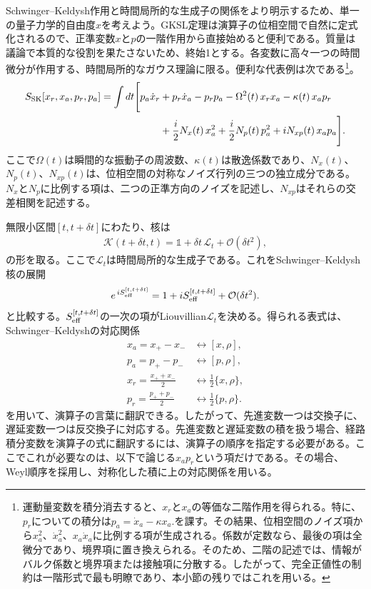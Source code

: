 \documentclass[a4paper,11pt,oneside]{article}
\theoremstyle{definition}
\numberwithin{equation}{section}
\begin{document}
Schwinger--Keldysh作用と時間局所的な生成子の関係をより明示するため、単一の量子力学的自由度\(x\)を考えよう。GKSL定理は演算子の位相空間で自然に定式化されるので、正準変数\(x\)と\(p\)の一階作用から直接始めると便利である。質量は議論で本質的な役割を果たさないため、終始1とする。各変数に高々一つの時間微分が作用する、時間局所的なガウス理論に限る。便利な代表例は次である\footnote{運動量変数を積分消去すると、\(x_r\)と\(x_a\)の等価な二階作用を得られる。特に、\(p_r\)についての積分は\(
p_a
=
\dot x_a-\kappa x_a.
\)を課す。その結果、位相空間のノイズ項から\(x_a^2\)、\(\dot x_a^2\)、\(x_a\dot x_a\)に比例する項が生成される。係数が定数なら、最後の項は全微分であり、境界項に置き換えられる。そのため、二階の記述では、情報がバルク係数と境界項または接触項に分散する。したがって、完全正値性の制約は一階形式で最も明瞭であり、本小節の残りではこれを用いる。}。
\begin{align}\label{GaussianSKfirstorder}
S_{\rm SK}[x_r,x_a,p_r,p_a]
=
\int dt \Bigg[
&p_a \dot x_r + p_r \dot x_a
-p_r p_a
-\Omega^2(t)\,x_r x_a
-\kappa(t)\,x_a p_r
\nonumber\\
&\qquad
+\frac{i}{2}N_x(t)\,x_a^2
+\frac{i}{2}N_p(t)\,p_a^2
+iN_{xp}(t)\,x_a p_a
\Bigg].
\end{align}
ここで\(\Omega(t)\)は瞬間的な振動子の周波数、\(\kappa(t)\)は散逸係数であり、\(N_x(t)\)、\(N_p(t)\)、\(N_{xp}(t)\)は、位相空間の対称なノイズ行列の三つの独立成分である。\(N_x\)と\(N_p\)に比例する項は、二つの正準方向のノイズを記述し、\(N_{xp}\)はそれらの交差相関を記述する。





無限小区間\([t,t+\delta t]\)にわたり、核は
\begin{align}\label{dictionary}
\mathcal K(t+\delta t,t)
=
\mathds{1}
+\delta t\,\mathcal L_t
+\mathcal O(\delta t^2),
\end{align}
の形を取る。ここで\(\mathcal L_t\)は時間局所的な生成子である。これをSchwinger--Keldysh核の展開
\begin{equation}
e^{\,iS_{\rm eff}^{[t,t+\delta t]}}
=
1+iS_{\rm eff}^{[t,t+\delta t]}
+\mathcal O(\delta t^2).
\end{equation}
と比較する。\(S_{\rm eff}^{[t,t+\delta t]}\)の一次の項がLiouvillian\(\mathcal L_t\)を決める。得られる表式は、Schwinger--Keldyshの対応関係
\begin{align}
x_a=x_+-x_-
&\longleftrightarrow
[x,\rho],
\\
p_a=p_+-p_-
&\longleftrightarrow
[p,\rho],
\\
x_r=\frac{x_++x_-}{2}
&\longleftrightarrow
\frac{1}{2}\{x,\rho\},
\\
p_r=\frac{p_++p_-}{2}
&\longleftrightarrow
\frac{1}{2}\{p,\rho\}.
\end{align}
を用いて、演算子の言葉に翻訳できる。したがって、先進変数一つは交換子に、遅延変数一つは反交換子に対応する。先進変数と遅延変数の積を扱う場合、経路積分変数を演算子の式に翻訳するには、演算子の順序を指定する必要がある。ここでこれが必要なのは、以下で論じる$ x_{a}p_{r}$という項だけである。その場合、Weyl順序を採用し、対称化した積に上の対応関係を用いる。
\end{document}
